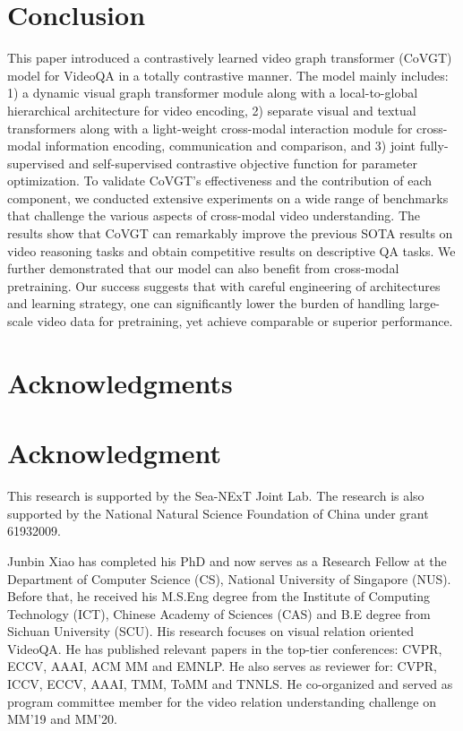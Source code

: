 \documentclass[10pt,journal,compsoc]{IEEEtran}
\begin{document}
\section{Conclusion}
\label{sec:con}
This paper introduced a contrastively learned video graph transformer (CoVGT) model for VideoQA in a totally contrastive manner. The model mainly includes: 1) a dynamic visual graph transformer module along with a local-to-global hierarchical architecture for video encoding, 2) separate visual and textual transformers along with a light-weight cross-modal interaction module for cross-modal information encoding, communication and comparison, and 3) joint fully-supervised and self-supervised contrastive objective function for parameter optimization. To validate CoVGT's effectiveness and the contribution of each component, 
we conducted extensive experiments on a wide range of benchmarks that challenge the various aspects of cross-modal video understanding. The results show that CoVGT can remarkably improve the previous SOTA results on video reasoning tasks and obtain competitive results on descriptive QA tasks.
We further demonstrated that our model can also benefit from cross-modal pretraining. Our success suggests that with careful engineering of architectures and learning strategy, one can significantly lower the burden of handling large-scale video data for pretraining, yet achieve comparable or superior performance.

 
\ifCLASSOPTIONcompsoc
\section*{Acknowledgments}
\else
\section*{Acknowledgment}
\fi
This research is supported by the Sea-NExT Joint Lab. The research is also supported by the National Natural Science Foundation of China under grant 61932009.

\ifCLASSOPTIONcaptionsoff
  \newpage
\fi

{


}


\begin{IEEEbiography}{Junbin Xiao} has completed his PhD and now serves as a Research Fellow at the Department of Computer Science (CS), National University of Singapore (NUS). Before that, he received his M.S.Eng degree from the Institute of Computing Technology (ICT), Chinese Academy of Sciences (CAS) and B.E degree from Sichuan University (SCU). His research focuses on visual relation oriented VideoQA. He has published relevant papers in the top-tier conferences: CVPR, ECCV, AAAI, ACM MM and EMNLP. He also serves as reviewer for: CVPR, ICCV, ECCV, AAAI, TMM, ToMM and TNNLS. He co-organized and served as program committee member for the video relation understanding challenge on MM'19 and MM'20.
\end{IEEEbiography}
\end{document}
